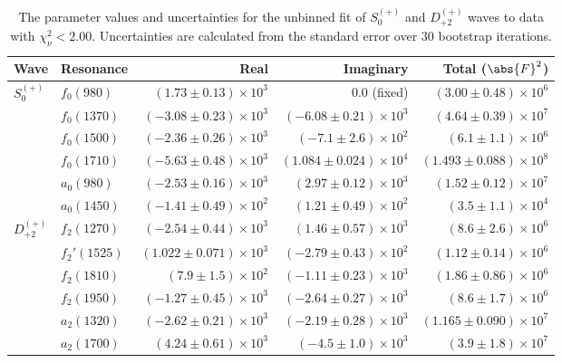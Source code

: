 \begin{table}[ht]
    \begin{center}
        \begin{tabular}{llrrr}\toprule
        Wave & Resonance & Real & Imaginary & Total ($\abs{F}^2$) \\\midrule
$S_{0}^{(+)}$ & $f_{0}(980)$ & $(1.73 \pm 0.13) \times 10^{3}$ & $0.0$ (fixed) & $(3.00 \pm 0.48) \times 10^{6}$ \\
 & $f_{0}(1370)$ & $(-3.08 \pm 0.23) \times 10^{3}$ & $(-6.08 \pm 0.21) \times 10^{3}$ & $(4.64 \pm 0.39) \times 10^{7}$ \\
 & $f_{0}(1500)$ & $(-2.36 \pm 0.26) \times 10^{3}$ & $(-7.1 \pm 2.6) \times 10^{2}$ & $(6.1 \pm 1.1) \times 10^{6}$ \\
 & $f_{0}(1710)$ & $(-5.63 \pm 0.48) \times 10^{3}$ & $(1.084 \pm 0.024) \times 10^{4}$ & $(1.493 \pm 0.088) \times 10^{8}$ \\
 & $a_{0}(980)$ & $(-2.53 \pm 0.16) \times 10^{3}$ & $(2.97 \pm 0.12) \times 10^{3}$ & $(1.52 \pm 0.12) \times 10^{7}$ \\
 & $a_{0}(1450)$ & $(-1.41 \pm 0.49) \times 10^{2}$ & $(1.21 \pm 0.49) \times 10^{2}$ & $(3.5 \pm 1.1) \times 10^{4}$ \\
$D_{+2}^{(+)}$ & $f_{2}(1270)$ & $(-2.54 \pm 0.44) \times 10^{3}$ & $(1.46 \pm 0.57) \times 10^{3}$ & $(8.6 \pm 2.6) \times 10^{6}$ \\
 & $f_{2}'(1525)$ & $(1.022 \pm 0.071) \times 10^{3}$ & $(-2.79 \pm 0.43) \times 10^{2}$ & $(1.12 \pm 0.14) \times 10^{6}$ \\
 & $f_{2}(1810)$ & $(7.9 \pm 1.5) \times 10^{2}$ & $(-1.11 \pm 0.23) \times 10^{3}$ & $(1.86 \pm 0.86) \times 10^{6}$ \\
 & $f_{2}(1950)$ & $(-1.27 \pm 0.45) \times 10^{3}$ & $(-2.64 \pm 0.27) \times 10^{3}$ & $(8.6 \pm 1.7) \times 10^{6}$ \\
 & $a_{2}(1320)$ & $(-2.62 \pm 0.21) \times 10^{3}$ & $(-2.19 \pm 0.28) \times 10^{3}$ & $(1.165 \pm 0.090) \times 10^{7}$ \\
 & $a_{2}(1700)$ & $(4.24 \pm 0.61) \times 10^{3}$ & $(-4.5 \pm 1.0) \times 10^{3}$ & $(3.9 \pm 1.8) \times 10^{7}$ \\\bottomrule
        \end{tabular}
    \caption{The parameter values and uncertainties for the unbinned fit of $S_{0}^{(+)}$ and $D_{+2}^{(+)}$ waves to data with $\chi^2_\nu < 2.00$. Uncertainties are calculated from the standard error over $30$ bootstrap iterations.}\label{tab:unbinned-fit-chisqdof-2.0-Sp0p-Dp2p}
    \end{center}
\end{table}
